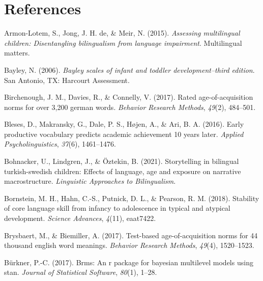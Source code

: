 \documentclass[
  man,floatsintext]{apa6}
\newlength{\cslhangindent}
\newlength{\cslentryspacingunit} %
\newenvironment{CSLReferences}[2] %
 {%
  \setlength{\parindent}{0pt}
  \ifodd #1
  \let\oldpar\par
  \def\par{\hangindent=\cslhangindent\oldpar}
  \fi
  \setlength{\parskip}{#2\cslentryspacingunit}
 }%
 {}
\begin{document}
\newpage

\hypertarget{references}{%
\section{References}\label{references}}

\hypertarget{refs}{}
\begin{CSLReferences}{1}{0}
\leavevmode{}%
Armon-Lotem, S., Jong, J. H. de, \& Meir, N. (2015). \emph{Assessing multilingual children: Disentangling bilingualism from language impairment}. Multilingual matters.

\leavevmode{}%
Bayley, N. (2006). \emph{Bayley scales of infant and toddler development--third edition}. San Antonio, TX: Harcourt Assessment.

\leavevmode{}%
Birchenough, J. M., Davies, R., \& Connelly, V. (2017). Rated age-of-acquisition norms for over 3,200 german words. \emph{Behavior Research Methods}, \emph{49}(2), 484--501.

\leavevmode{}%
Bleses, D., Makransky, G., Dale, P. S., Højen, A., \& Ari, B. A. (2016). Early productive vocabulary predicts academic achievement 10 years later. \emph{Applied Psycholinguistics}, \emph{37}(6), 1461--1476.

\leavevmode{}%
Bohnacker, U., Lindgren, J., \& Öztekin, B. (2021). Storytelling in bilingual turkish-swedish children: Effects of language, age and exposure on narrative macrostructure. \emph{Linguistic Approaches to Bilingualism}.

\leavevmode{}%
Bornstein, M. H., Hahn, C.-S., Putnick, D. L., \& Pearson, R. M. (2018). Stability of core language skill from infancy to adolescence in typical and atypical development. \emph{Science Advances}, \emph{4}(11), eaat7422.

\leavevmode{}%
Brysbaert, M., \& Biemiller, A. (2017). Test-based age-of-acquisition norms for 44 thousand english word meanings. \emph{Behavior Research Methods}, \emph{49}(4), 1520--1523.

\leavevmode{}%
Bürkner, P.-C. (2017). Brms: An r package for bayesian multilevel models using stan. \emph{Journal of Statistical Software}, \emph{80}(1), 1--28.


\end{CSLReferences}
\end{document}
